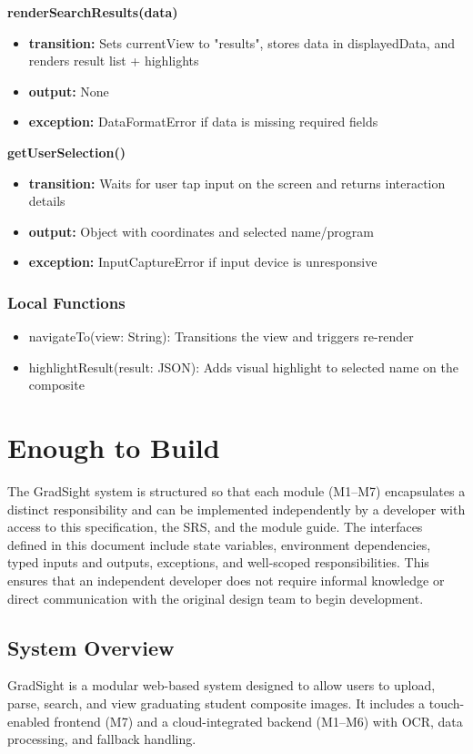 \documentclass[12pt, titlepage]{article}
\begin{document}
\noindent \textbf{renderSearchResults(data)}
\begin{itemize}
  \item \textbf{transition:} Sets currentView to "results", stores data in displayedData, and renders result list + highlights
  \item \textbf{output:} None
  \item \textbf{exception:} DataFormatError if data is missing required fields
\end{itemize}

\noindent \textbf{getUserSelection()}
\begin{itemize}
  \item \textbf{transition:} Waits for user tap input on the screen and returns interaction details
  \item \textbf{output:} Object with coordinates and selected name/program
  \item \textbf{exception:} InputCaptureError if input device is unresponsive
\end{itemize}

\subsubsection*{Local Functions}

\begin{itemize}
  \item navigateTo(view: String): Transitions the view and triggers re-render
  \item highlightResult(result: JSON): Adds visual highlight to selected name on the composite
\end{itemize}

\section{Enough to Build}
\label{SecEnoughToBuild}

The GradSight system is structured so that each module (M1–M7) encapsulates a distinct responsibility and can be implemented independently by a developer with access to this specification, the SRS, and the module guide. The interfaces defined in this document include state variables, environment dependencies, typed inputs and outputs, exceptions, and well-scoped responsibilities. This ensures that an independent developer does not require informal knowledge or direct communication with the original design team to begin development.

\subsection*{System Overview}
GradSight is a modular web-based system designed to allow users to upload, parse, search, and view graduating student composite images. It includes a touch-enabled frontend (M7) and a cloud-integrated backend (M1–M6) with OCR, data processing, and fallback handling.
\end{document}
